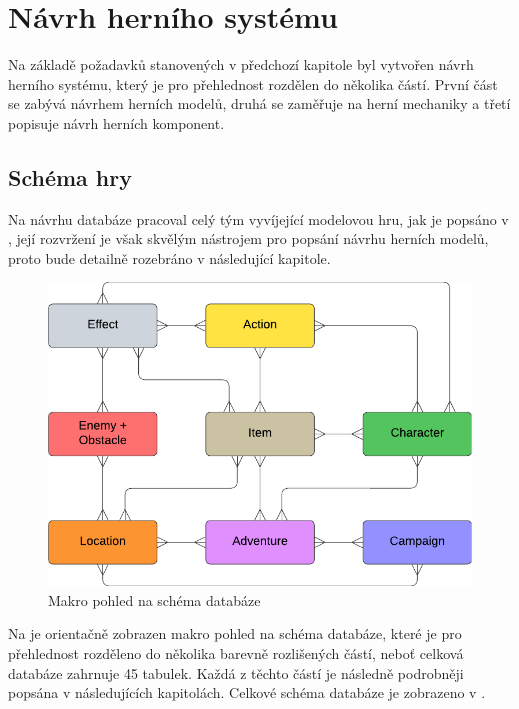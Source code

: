 \chapter{Návrh herního systému}
\label{chap:design}

Na základě požadavků stanovených v předchozí kapitole  byl vytvořen návrh herního systému, který je pro přehlednost rozdělen do několika částí. První část se zabývá návrhem herních modelů, druhá se zaměřuje na herní mechaniky a třetí popisuje návrh herních komponent.


\section{Schéma hry}
\label{sec:design_scheme}

Na návrhu databáze pracoval celý tým vyvíjející modelovou hru, jak je popsáno v , její rozvržení je však skvělým nástrojem pro popsání návrhu herních modelů, proto bude detailně rozebráno v následující kapitole.

\begin{figure}[h]
    \centering
    \includegraphics[scale=0.95]{../../shared/diagrams/er_macro.pdf}
    \caption{Makro pohled na schéma databáze}
    \label{diag:er_macro}
\end{figure}

Na  je orientačně zobrazen makro pohled na schéma databáze, které je pro přehlednost rozděleno do několika barevně rozlišených částí, neboť celková databáze zahrnuje 45 tabulek. Každá z těchto částí je následně podrobněji popsána v následujících kapitolách. Celkové schéma databáze je zobrazeno v .


